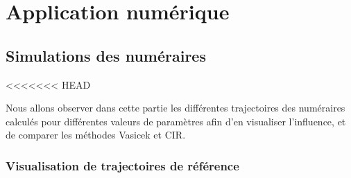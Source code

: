 \section{Application numérique}

\subsection{Simulations des numéraires}

<<<<<<< HEAD

Nous allons observer dans cette partie les différentes trajectoires des numéraires calculés pour différentes valeurs de paramètres afin d'en visualiser l'influence, et de comparer les méthodes Vasicek et CIR.


\subsubsection{Visualisation de trajectoires de référence}


